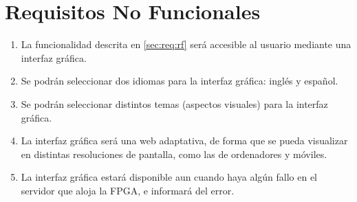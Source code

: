 \section{Requisitos No Funcionales\label{sec:req:rnf}}

\begin{enumerate}[label=\bfseries RNF. \arabic*]
  \setlength{\itemsep}{10pt}
  \setlength{\parskip}{10pt}
  \setlength{\parsep}{10pt}
  \item La funcionalidad descrita en \ref{sec:req:rf} será accesible al usuario mediante una interfaz gráfica.
  \item Se podrán seleccionar dos idiomas para la interfaz gráfica: inglés y español.
  \item Se podrán seleccionar distintos temas (aspectos visuales) para la interfaz gráfica.
  \item La interfaz gráfica será una web adaptativa, de forma que se pueda visualizar en distintas resoluciones de pantalla, como las de ordenadores y móviles.
  \item La interfaz gráfica estará disponible aun cuando haya algún fallo en el servidor que aloja la \gls{FPGA}, e informará del error.
\end{enumerate}